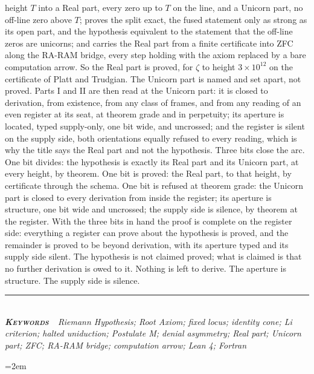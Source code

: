 \documentclass[10pt]{article}
\begin{document}
{\begin{minipage}{\textwidth}
{height \(T\) into a Real part, every zero up to \(T\) on the line, and a
Unicorn part, no off-line zero above \(T\); proves the split exact, the
fused statement only as strong as its open part, and the hypothesis
equivalent to the statement that the off-line zeros are unicorns; and
carries the Real part from a finite certificate into ZFC along the
RA-RAM bridge, every step holding with the axiom replaced by a bare
computation arrow. So the Real part is proved, for \(\zeta\) to height
\(3 \times 10^{12}\) on the certificate of Platt and Trudgian. The
Unicorn part is named and set apart, not proved. Parts I and II are then
read at the Unicorn part: it is closed to derivation, from existence,
from any class of frames, and from any reading of an even register at
its seat, at theorem grade and in perpetuity; its aperture is located,
typed supply-only, one bit wide, and uncrossed; and the register is
silent on the supply side, both orientations equally refused to every
reading, which is why the title says the Real part and not the
hypothesis. Three bits close the arc. One bit divides: the hypothesis is
exactly its Real part and its Unicorn part, at every height, by theorem.
One bit is proved: the Real part, to that height, by certificate through
the schema. One bit is refused at theorem grade: the Unicorn part is
closed to every derivation from inside the register; its aperture is
structure, one bit wide and uncrossed; the supply side is silence, by
theorem at the register. With the three bits in hand the proof is
complete on the register side: everything a register can prove about the
hypothesis is proved, and the remainder is proved to be beyond
derivation, with its aperture typed and its supply side silent. The
hypothesis is not claimed proved; what is claimed is that no further
derivation is owed to it. Nothing is left to derive. The aperture is
structure. The supply side is silence.}\\[4pt]
{\color{accent}\rule{\textwidth}{0.6pt}}\\[3pt]
{\itshape\footnotesize\color{faint}\textbf{\upshape\scshape\color{deep}Keywords\ }\ Riemann
Hypothesis; Root Axiom; fixed locus; identity cone; Li criterion; halted
uniduction; Postulate M; denial asymmetry; Real part; Unicorn part; ZFC;
RA-RAM bridge; computation arrow; Lean 4; Fortran}\\[12pt]
\end{minipage}
}
\thispagestyle{fancy}
\let\oldunderscore\_\renewcommand{\_}{\oldunderscore\allowbreak}

\emergencystretch=2em
\end{document}
